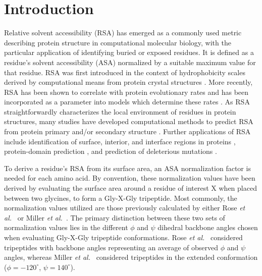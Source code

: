 \documentclass[11pt]{article}
\begin{document}
\section*{Introduction}

Relative solvent accessibility (RSA) has emerged as a commonly used metric describing protein structure in computational molecular biology, with the particular application of identifying buried or exposed residues. It is defined as a residue's solvent accessibility (ASA) normalized by a suitable maximum value for that residue.  RSA was first introduced in the context of hydrophobicity scales derived by computational means from protein crystal structures \cite{Chothia1976,Rose1985,Miller1987,Moelbert2004,Shaytan2009}. More recently, RSA has been shown to correlate with protein evolutionary rates and has been incorporated as a parameter into models which determine these rates \cite{Goldmanetal1998,Bloometal2006,FranzosaXia2009,Zhouetal2009,FranzosaXia2012,Scherrer2012,MeyerWilke2012,ConantStadler2009}. As RSA straightforwardly characterizes the local environment of residues in protein structures, many studies have developed computational methods to predict RSA from protein primary and/or secondary structure \cite{RostSander1994,Pollastrietal2002,KimPark2004,Adamczaketal2004,NguyenRajapakse2005,Petersenetal2009,SinghAhmad2009}. Further applications of RSA include identification of surface, interior, and interface regions in proteins \cite{Levy2010}, protein-domain prediction \cite{Chengetal2006}, and prediction of deleterious mutations \cite{ChenZhou2005}.
 
To derive a residue's RSA from its surface area, an ASA normalization factor is needed for each amino acid. By convention, these normalization values have been derived by evaluating the surface area around a residue of interest X when placed between two glycines, to form a Gly-X-Gly tripeptide. Most commonly, the normalization values utilized are those previously calculated by either Rose \emph{et al.}~\cite{Rose1985} or Miller \emph{et al.}~\cite{Miller1987}. The primary distinction between these two sets of normalization values lies in the different $\phi$ and $\psi$ dihedral backbone angles chosen when evaluating Gly-X-Gly tripeptide conformations. Rose \emph{et al.}~\cite{Rose1985} considered tripeptides with backbone angles representing an average of observed $\phi$ and $\psi$ angles, whereas Miller \emph{et al.}~\cite{Miller1987} considered tripeptides in the extended conformation ($\phi= -120^\circ$, $\psi=140^\circ$).
\end{document}
